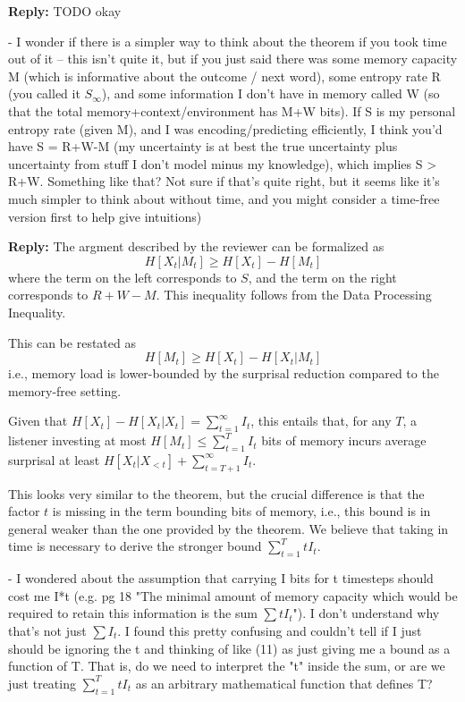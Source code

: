 \documentclass{article}[11pt,a4paper,oneside]
\newenvironment{reply}
  {\par\medskip
   \color{blue}%
   \begin{framed}
   \textbf{Reply: }\ignorespaces}
 {\end{framed}
  \medskip}
\begin{document}
\begin{reply}
	TODO okay
\end{reply}

- I wonder if there is a simpler way to think about the theorem if you took time out of it -- this isn't quite it, but if you just said there was some memory capacity M (which is informative about the outcome / next word), some entropy rate R (you called it $S_\infty$), and some information I don't have in memory called W (so that the total memory+context/environment has M+W bits). If S is my personal entropy rate (given M), and I was encoding/predicting efficiently, I think you'd have S = R+W-M (my uncertainty is at best the true uncertainty plus uncertainty from stuff I don't model minus my knowledge), which implies S > R+W. Something like that? Not sure if that's quite right, but it seems like it's much simpler to think about without time, and you might consider a time-free version first to help give intuitions)

\begin{reply}
The argment described by the reviewer can be formalized as
\begin{equation}
H[X_{t}|M_t] \geq H[X_{t}] - H[M_t]
\end{equation}
where the term on the left corresponds to $S$, and the term on the right corresponds to $R+W-M$.
This inequality follows from the Data Processing Inequality.

This can be restated as 
\begin{equation}
H[M_t] \geq H[X_{t}] - H[X_{t}|M_t]
\end{equation}
i.e., memory load is lower-bounded by the surprisal reduction compared to the memory-free setting.

	Given that $H[X_{t}] - H[X_t|X_{t}] = \sum_{t=1}^\infty I_t$, this entails that, for any $T$, a listener investing at most $H[M_t] \leq \sum_{t=1}^T I_t$ bits of memory incurs average surprisal at least $H[X_t|X_{<t}] + \sum_{t=T+1}^\infty I_t$.

This looks very similar to the theorem, but the crucial difference is that the factor $t$ is missing in the term bounding bits of memory, i.e., this bound is in general weaker than the one provided by the theorem.
	We believe that taking in time is necessary to derive the stronger bound $\sum_{t=1}^T t I_t$.
\end{reply}

- I wondered about the assumption that carrying I bits for t timesteps should cost me I*t (e.g. pg 18 "The minimal amount of memory capacity which would be required to retain this information is the sum $\sum t I_t$"). I don't understand why that's not just $\sum I_t$. I found this pretty confusing and couldn't tell if I just should be ignoring the t and thinking of like (11) as just giving me a bound as a function of T. That is, do we need to interpret the "t" inside the sum, or are we just treating $\sum_{t=1}^T t I_t$ as an arbitrary mathematical function that defines T?
\end{document}
